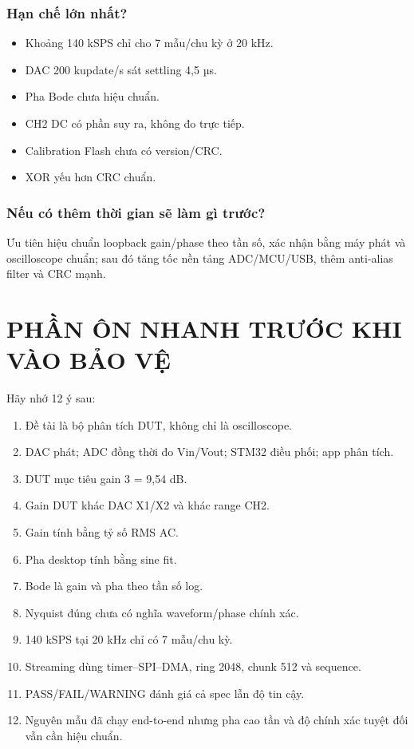 \documentclass[12pt,a4paper,oneside]{article}
\begin{document}
\section{Hạn chế lớn nhất?}

\begin{itemize}
\item Khoảng 140 kSPS chỉ cho 7 mẫu/chu kỳ ở 20 kHz.
\item DAC 200 kupdate/s sát settling 4,5 µs.
\item Pha Bode chưa hiệu chuẩn.
\item CH2 DC có phần suy ra, không đo trực tiếp.
\item Calibration Flash chưa có version/CRC.
\item XOR yếu hơn CRC chuẩn.
\end{itemize}

\section{Nếu có thêm thời gian sẽ làm gì trước?}

Ưu tiên hiệu chuẩn loopback gain/phase theo tần số, xác nhận bằng máy phát và oscilloscope chuẩn; sau đó tăng tốc nền tảng ADC/MCU/USB, thêm anti-alias filter và CRC mạnh.

\clearpage

\clearpage
\part{PHẦN ÔN NHANH TRƯỚC KHI VÀO BẢO VỆ}
\setcounter{section}{0}

Hãy nhớ 12 ý sau:

\begin{enumerate}
\item Đề tài là bộ phân tích DUT, không chỉ là oscilloscope.
\item DAC phát; ADC đồng thời đo Vin/Vout; STM32 điều phối; app phân tích.
\item DUT mục tiêu gain 3 = 9,54 dB.
\item Gain DUT khác DAC X1/X2 và khác range CH2.
\item Gain tính bằng tỷ số RMS AC.
\item Pha desktop tính bằng sine fit.
\item Bode là gain và pha theo tần số log.
\item Nyquist đúng chưa có nghĩa waveform/phase chính xác.
\item 140 kSPS tại 20 kHz chỉ có 7 mẫu/chu kỳ.
\item Streaming dùng timer–SPI–DMA, ring 2048, chunk 512 và sequence.
\item PASS/FAIL/WARNING đánh giá cả spec lẫn độ tin cậy.
\item Nguyên mẫu đã chạy end-to-end nhưng pha cao tần và độ chính xác tuyệt đối vẫn cần hiệu chuẩn.
\end{enumerate}
\end{document}
